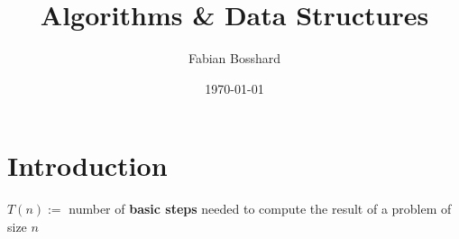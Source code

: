 


\title{Algorithms \& Data Structures}
\author{Fabian Bosshard}
\date{\today}




\maketitle

\tableofcontents

\section{Introduction}

$T(n) :=$ number of \textbf{basic steps} needed to compute the result of a problem of size $n$

